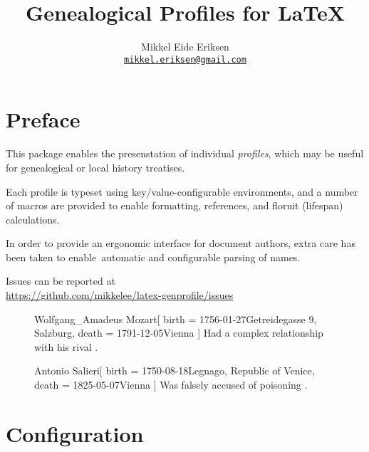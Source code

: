 \documentclass[
	a4paper,
]{article}
\title{Genealogical Profiles for \LaTeX}
\author{Mikkel Eide Eriksen\\%
	\href{mailto:mikkel.eriksen@gmail.com}{\texttt{mikkel.eriksen@gmail.com}}}
\begin{document}
\maketitle

\section*{Preface} %

This package enables the presenstation of individual \emph{profiles}, which may be useful for genealogical or local history treatises.

Each profile is typeset using key/value-configurable environments, and a number of macros are provided to enable formatting, references, and floruit (lifespan) calculations.

In order to provide an ergonomic interface for document authors, extra care has been taken to enable automatic and configurable parsing of names.

Issues can be reported at\\\null\hfill\url{https://github.com/mikkelee/latex-genprofile/issues}


\begin{figure}
\begingroup
{}
\begin{gprProfile}{Wolfgang_Amadeus Mozart}[
	birth = {1756-01-27}{Getreidegasse 9, Salzburg},
	death = {1791-12-05}{Vienna}
]
	Had a complex relationship with his rival .
\end{gprProfile}
\begin{gprProfile}{Antonio Salieri}[
	birth = {1750-08-18}{Legnago, Republic of Venice},
	death = {1825-05-07}{Vienna}
]
	Was falsely accused of poisoning .
\end{gprProfile}
\endgroup
\end{figure}

\clearpage
\section{Configuration} %
\end{document}
